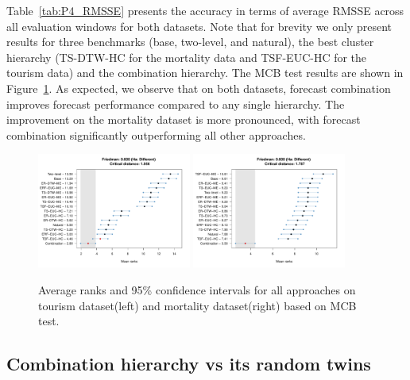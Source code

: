 \documentclass[a4paper,review,12pt,authoryear]{elsarticle}
\begin{document}

Table~\ref{tab:P4_RMSSE} presents the accuracy in terms of average RMSSE across all evaluation windows for both datasets. Note that for brevity we only present results for three benchmarks (base, two-level, and natural), the best cluster hierarchy (TS-DTW-HC for the mortality data and TSF-EUC-HC for the tourism data) and the combination hierarchy. The MCB test results are shown in Figure~\ref{fig:P4_bench_mcb}. 
As expected, we observe that on both datasets, forecast combination improves forecast performance compared to any single hierarchy. 
The improvement on the mortality dataset is more pronounced, with forecast combination significantly outperforming all other approaches.

\begin{figure}[h!]
    \centering
    \includegraphics[width=0.45\textwidth]{figures/hierarchy_rmsse/tourism/P4_benchmarks_h12.pdf}
    \includegraphics[width=0.45\textwidth]{figures/hierarchy_rmsse/mortality/P4_benchmarks_h12.pdf}
    \caption{Average ranks and 95\% confidence intervals for all approaches on tourism dataset(left) and mortality dataset(right) based on MCB test.}
    \label{fig:P4_bench_mcb}
\end{figure}



\subsection{Combination hierarchy vs its random twins}
\end{document}
